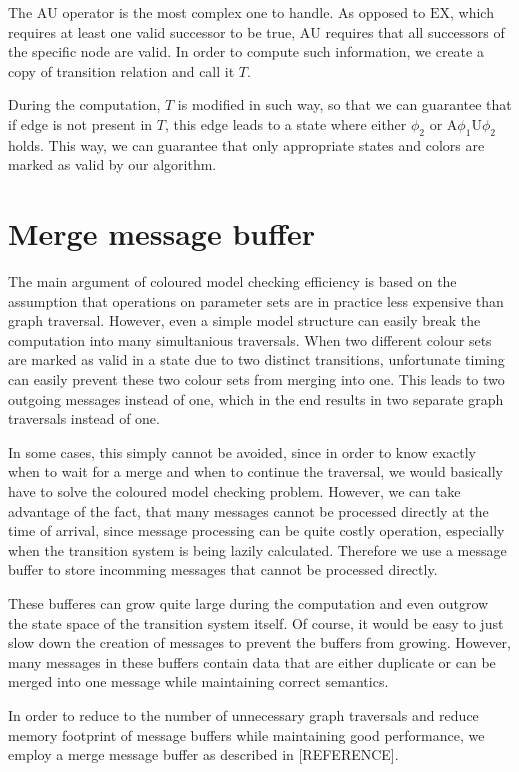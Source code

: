 \documentclass[12pt,oneside, draft]{fithesis2}
\newcommand{\au}[2]{\ensuremath{\mbox{A} #1 \mbox{U} #2 }}
\newcommand{\ex}[1]{\ensuremath{\mbox{EX} #1}}
\begin{document}
				The \au{}{} operator is the most complex one to handle. As opposed to \ex{}{}, which requires at least one valid successor to be true, \au{}{} requires that all successors of the specific node are valid. In order to compute such information, we create a copy of transition relation and call it $T$. 
				
				During the computation, $T$ is modified in such way, so that we can guarantee that if edge is not present in $T$, this edge leads to a state where either $\phi_2$ or \au{\phi_1}{\phi_2} holds. This way, we can guarantee that only appropriate states and colors are marked as valid by our algorithm.
				
								
		\section{Merge message buffer}
			
			The main argument of coloured model checking efficiency is based on the assumption that operations on parameter sets are in practice less expensive than graph traversal. However, even a simple model structure can easily break the computation into many simultanious traversals. When two different colour sets are marked as valid in a state due to two distinct transitions, unfortunate timing can easily prevent these two colour sets from merging into one. This leads to two outgoing messages instead of one, which in the end results in two separate graph traversals instead of one. 
			
			In some cases, this simply cannot be avoided, since in order to know exactly when to wait for a merge and when to continue the traversal, we would basically have to solve the coloured model checking problem. However, we can take advantage of the fact, that many messages cannot be processed directly at the time of arrival, since message processing can be quite costly operation, especially when the transition system is being lazily calculated. Therefore we use a message buffer to store incomming messages that cannot be processed directly.
			
			These bufferes can grow quite large during the computation and even outgrow the state space of the transition system itself. Of course, it would be easy to just slow down the creation of messages to prevent the buffers from growing. However, many messages in these buffers contain data that are either duplicate or can be merged into one message while maintaining correct semantics.
			
			In order to reduce to the number of unnecessary graph traversals and reduce memory footprint of message buffers while maintaining good performance, we employ a merge message buffer as described in [REFERENCE]. 
			
\end{document}
